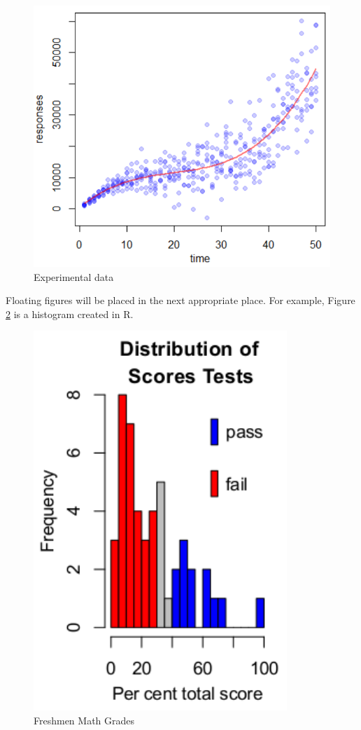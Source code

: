 \documentclass[10pt,twocolumn,twoside,a4paper]{article}
\begin{document}
\begin{figure}[htb]
\centering
\includegraphics[width=\columnwidth,
height=\columnwidth]{img/experiment.pdf}
\caption{Experimental data}
\label{fig_experiment}
\end{figure}


Floating figures will be placed in the next appropriate place. For example, Figure \ref{fig_histogram} is a histogram created in R.

\begin{figure}[htb]
\centering
\includegraphics[width=\columnwidth,height=\columnwidth]{img/Rplot.pdf}
\caption{Freshmen Math Grades}
\label{fig_histogram}
\end{figure}
\end{document}
